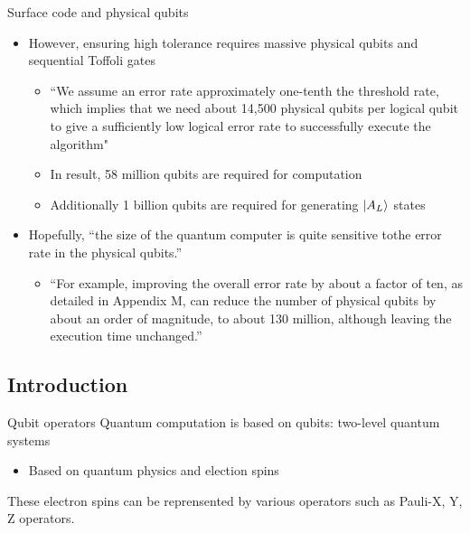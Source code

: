 \documentclass{beamer}
\begin{document}
    \begin{frame}[t]{Surface code and physical qubits}
        \begin{itemize}
            \item However, ensuring high tolerance requires massive physical qubits and sequential Toffoli gates
            \begin{itemize}
                \item ``We assume an error rate approximately one-tenth the threshold rate, which implies that we need about 14,500 physical qubits per logical qubit to give a sufficiently low logical error rate to successfully execute the algorithm"
                \item In result, 58 million qubits are required for computation
                \item Additionally 1 billion qubits are required for generating $\ket{A_L}$ states
            \end{itemize}
            \item Hopefully, ``the size of the quantum computer is quite sensitive tothe error rate in the physical qubits.''
            \begin{itemize}
                \item ``For example, improving the overall error rate by about a factor of ten, as detailed in Appendix M, can reduce the number of physical qubits by about an order of magnitude, to about 130 million, although leaving the execution time unchanged.''
            \end{itemize} 
        \end{itemize}
    \end{frame}
    
    \subsection{Introduction}
    \begin{frame}{Qubit operators}
        Quantum computation is based on qubits: two-level quantum systems
        \begin{itemize}
            \item Based on quantum physics and election spins
        \end{itemize}
        These electron spins can be reprensented by various operators such as Pauli-X, Y, Z operators.
    \end{frame} 
           
\end{document}
